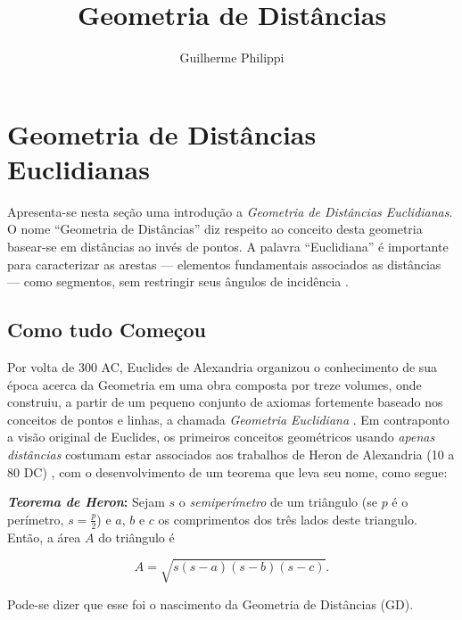 \documentclass[a4paper,12pt]{article}
\title{Geometria de Distâncias}
\author{Guilherme Philippi}
\begin{document}
\maketitle
\tableofcontents

\section{Geometria de Distâncias Euclidianas}
Apresenta-se nesta seção uma introdução a \textit{Geometria de Distâncias Euclidianas}. O nome ``Geometria de Distâncias'' diz respeito ao conceito desta geometria basear-se em distâncias ao invés de pontos. A palavra ``Euclidiana'' é importante para caracterizar as arestas --- elementos fundamentais associados as distâncias --- como segmentos, sem restringir seus ângulos de incidência \cite{libertiEDG}.

\subsection{Como tudo Começou}

Por volta de 300 AC, Euclides de Alexandria organizou o conhecimento de sua época acerca da Geometria em uma obra composta por treze volumes, onde construiu, a partir de um pequeno conjunto de axiomas fortemente baseado nos conceitos de pontos e linhas, a chamada \textit{Geometria Euclidiana} \cite{elementosEuclides}. Em contraponto a visão original de Euclides, os primeiros conceitos geométricos usando \textit{apenas distâncias} costumam estar associados aos trabalhos de Heron de Alexandria (10 a 80 DC) \cite{libertiEDG}, com o desenvolvimento de um teorema que leva seu nome, como segue: 
\begin{center}
	\begin{minipage}{0.9 \linewidth}
		\textbf{\textit{Teorema de Heron}:} Sejam $s$ o \textit{semiperímetro} de um triângulo (se $p$ é o perímetro, $s = \frac{p}{2}$) e $a$, $b$ e $c$ os comprimentos dos três lados deste triangulo. Então, a área $A$ do triângulo é
		
		\begin{equation}\tag{Fórmula de Heron}
		A = \sqrt{s(s-a)(s-b)(s-c)}.
		\label{eq:heron}
		\end{equation}
	\end{minipage}
\end{center} 
Pode-se dizer que esse foi o nascimento da Geometria de Distâncias (GD).
\end{document}
